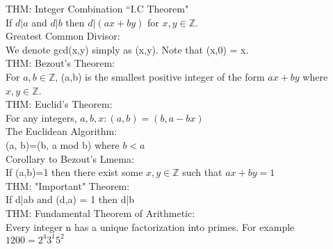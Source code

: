\documentclass[12pt]{article}
\def \z{\mathbb{Z}}
\def \no{\noindent}
\begin{document}
\no THM: Integer Combination ``I.C Theorem"\\
\hangindent=1cm If $d|a$ and $d|b$ then $d|(ax + by)$ for $x,y \in \z$.\\

\no Greatest Common Divisor:\\
\hangindent=1cm We denote gcd(x,y) simply as (x,y). Note that (x,0) = x.\\

\no THM: Bezout's Theorem:\\
\hangindent=1cm For $a,b \in \z$, (a,b) is the smallest positive integer of the form $ax+by$ where $x,y \in \z$.\\

\no THM: Euclid's Theorem:\\
\hangindent=1cm For any integers, $a, b, x: (a, b) = (b, a - bx)$\\

\no The Euclidean Algorithm:\\
\hangindent=1cm (a, b)=(b, a mod b) where $b<a$\\

\no Corollary to Bezout's Lmema:\\
\hangindent=1cm If (a,b)=1 then there exist some $x,y \in \z$ such that $ax + by = 1$\\

\no THM: "Important" Theorem:\\
\hangindent=1cm  If d|ab and (d,a) = 1 then d|b\\

\no THM: Fundamental Theorem of Arithmetic:\\
\hangindent=1cm Every integer n has a unique factorization into primes. For example $1200 = 2^4 3^1 5^2$\\
\end{document}
